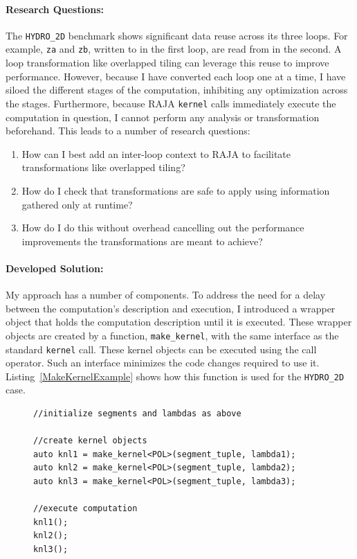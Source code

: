 \documentclass{article}
\begin{document}
\paragraph{Research Questions:}
The \verb.HYDRO_2D. benchmark shows significant data reuse across its three loops.
For example, \verb.za. and \verb.zb., written to in the first loop, are read from in the second. 
A loop transformation like overlapped tiling can leverage this reuse to improve performance.
However, because I have converted each loop one at a time, I have siloed the different stages of the computation, inhibiting any optimization across the stages.
Furthermore, because RAJA \verb.kernel. calls immediately execute the computation in question, I cannot perform any analysis or transformation beforehand.
This leads to a number of research questions:
\begin{enumerate}[label=Q1.\arabic*]
\item How can I best add an inter-loop context to RAJA to facilitate transformations like overlapped tiling?\label{q:context}
\item How do I check that transformations are safe to apply using information gathered only at runtime? \label{q:safety}
\item How do I do this without overhead cancelling out the performance improvements the transformations are meant to achieve? \label{q:overhead1}
\end{enumerate}

\paragraph{Developed Solution:}

My approach has a number of components.
To address the need for a delay between the computation's description and execution, I introduced a wrapper object that holds the computation description until it is executed.
These wrapper objects are created by a function, \verb.make_kernel., with the same interface as the standard \verb.kernel. call. 
These kernel objects can be executed using the call operator.
Such an interface minimizes the code changes required to use it.
Listing~\ref{MakeKernelExample} shows how this function is used for the \verb.HYDRO_2D. case.

\begin{figure}
    \begin{lstlisting}[caption={Example usage of the \texttt{make\_kernel} function.},label={MakeKernelExample}]
//initialize segments and lambdas as above

//create kernel objects
auto knl1 = make_kernel<POL>(segment_tuple, lambda1);
auto knl2 = make_kernel<POL>(segment_tuple, lambda2);
auto knl3 = make_kernel<POL>(segment_tuple, lambda3);

//execute computation
knl1();
knl2();
knl3();
    \end{lstlisting}
\end{figure}
\end{document}
